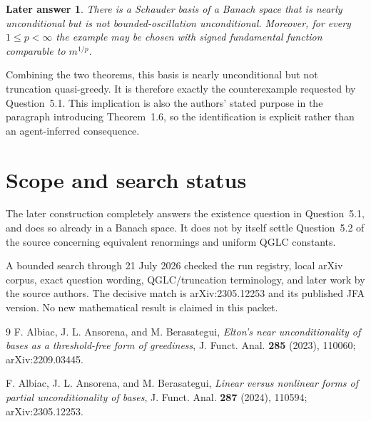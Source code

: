 \documentclass[11pt]{article}
\newtheorem*{answer}{Later answer}
\begin{document}
\begin{answer}
There is a Schauder basis of a Banach space that is nearly unconditional
but is not bounded-oscillation unconditional.  Moreover, for every
$1\leq p<\infty$ the example may be chosen with signed fundamental
function comparable to $m^{1/p}$.
\end{answer}

Combining the two theorems, this basis is nearly unconditional but not
truncation quasi-greedy.  It is therefore exactly the counterexample
requested by Question~5.1.  This implication is also the authors' stated
purpose in the paragraph introducing Theorem~1.6, so the identification is
explicit rather than an agent-inferred consequence.

\section{Scope and search status}

The later construction completely answers the existence question in
Question~5.1, and does so already in a Banach space.  It does not by itself
settle Question~5.2 of the source concerning equivalent renormings and
uniform QGLC constants.

A bounded search through 21 July 2026 checked the run registry, local arXiv
corpus, exact question wording, QGLC/truncation terminology, and later work
by the source authors.  The decisive match is arXiv:2305.12253 and its
published JFA version.  No new mathematical result is claimed in this
packet.

\begin{thebibliography}{9}
F. Albiac, J. L. Ansorena, and M. Berasategui,
\emph{Elton's near unconditionality of bases as a threshold-free form of
greediness}, J. Funct. Anal. \textbf{285} (2023), 110060;
arXiv:2209.03445.

F. Albiac, J. L. Ansorena, and M. Berasategui,
\emph{Linear versus nonlinear forms of partial unconditionality of bases},
J. Funct. Anal. \textbf{287} (2024), 110594;
arXiv:2305.12253.
\end{thebibliography}
\end{document}
